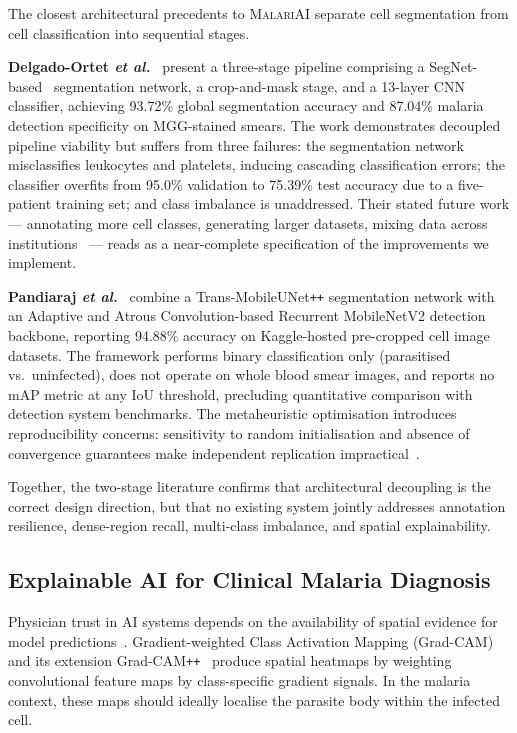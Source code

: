 \documentclass[10pt,twocolumn]{article}
\newcommand{\etal}{\textit{et al.}}
\newcommand{\malariai}{\textsc{MalariAI}}
\begin{document}
The closest architectural precedents to \malariai{} separate cell
segmentation from cell classification into sequential stages.

\textbf{Delgado-Ortet \etal}~\cite{delgado2020} present a three-stage
pipeline comprising a SegNet-based~\cite{badrinarayanan2017} segmentation
network, a crop-and-mask stage, and a 13-layer CNN classifier, achieving
93.72\% global segmentation accuracy and 87.04\% malaria detection
specificity on MGG-stained smears. The work demonstrates decoupled pipeline
viability but suffers from three failures: the segmentation network
misclassifies leukocytes and platelets, inducing cascading classification
errors; the classifier overfits from 95.0\% validation to 75.39\% test
accuracy due to a five-patient training set; and class imbalance is
unaddressed. Their stated future work --- annotating more cell classes,
generating larger datasets, mixing data across institutions~\cite{delgado2020}
--- reads as a near-complete specification of the improvements we implement.

\textbf{Pandiaraj \etal}~\cite{pandiaraj2024} combine a
Trans-MobileUNet\texttt{++} segmentation network with an Adaptive and
Atrous Convolution-based Recurrent MobileNetV2 detection backbone, reporting
94.88\% accuracy on Kaggle-hosted pre-cropped cell image datasets. The
framework performs binary classification only (parasitised vs.\ uninfected),
does not operate on whole blood smear images, and reports no mAP metric at
any IoU threshold, precluding quantitative comparison with detection system
benchmarks. The metaheuristic optimisation introduces reproducibility
concerns: sensitivity to random initialisation and absence of convergence
guarantees make independent replication impractical~\cite{pandiaraj2024}.

Together, the two-stage literature confirms that architectural decoupling
is the correct design direction, but that no existing system jointly
addresses annotation resilience, dense-region recall, multi-class imbalance,
and spatial explainability.

\subsection{Explainable AI for Clinical Malaria Diagnosis}
\label{ssec:xai}

Physician trust in AI systems depends on the availability of spatial
evidence for model predictions~\cite{xai_ensemble2025}. Gradient-weighted
Class Activation Mapping (Grad-CAM)~\cite{selvaraju2017} and its
extension Grad-CAM\texttt{++}~\cite{chattopadhyay2018} produce spatial
heatmaps by weighting convolutional feature maps by class-specific gradient
signals. In the malaria context, these maps should ideally localise the
parasite body within the infected cell.
\end{document}
